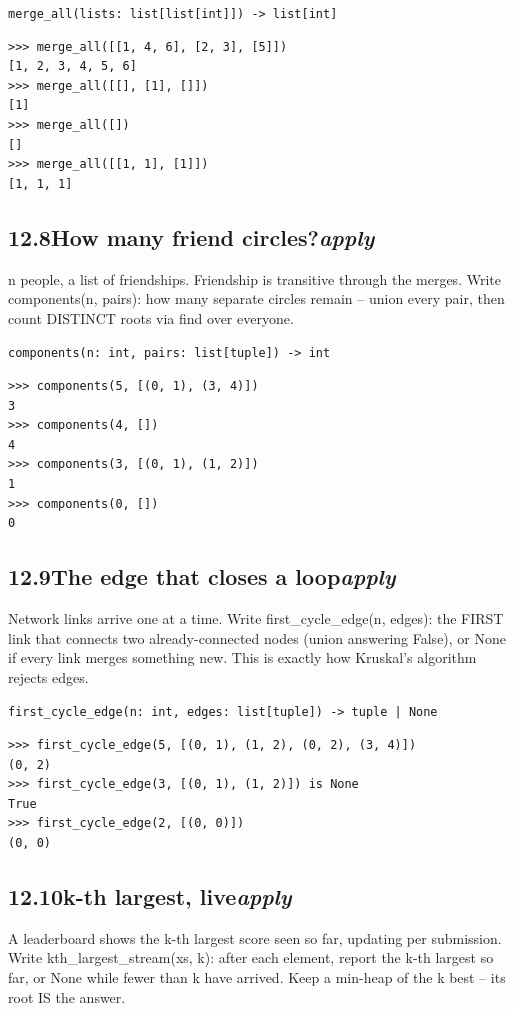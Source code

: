 \documentclass[10pt,letterpaper]{book}
\begin{document}
\noindent\texttt{merge\_all(lists: list[list[int]]) -> list[int]}
\begin{lstlisting}[style=ex]
>>> merge_all([[1, 4, 6], [2, 3], [5]])
[1, 2, 3, 4, 5, 6]
>>> merge_all([[], [1], []])
[1]
>>> merge_all([])
[]
>>> merge_all([[1, 1], [1]])
[1, 1, 1]
\end{lstlisting}
\subsection*{12.8\quad How many friend circles?\hfill\textnormal{\textit{apply}}}
n people, a list of friendships. Friendship is transitive through the merges. Write components(n, pairs): how many separate circles remain -- union every pair, then count DISTINCT roots via find over everyone.

\noindent\texttt{components(n: int, pairs: list[tuple]) -> int}
\begin{lstlisting}[style=ex]
>>> components(5, [(0, 1), (3, 4)])
3
>>> components(4, [])
4
>>> components(3, [(0, 1), (1, 2)])
1
>>> components(0, [])
0
\end{lstlisting}
\subsection*{12.9\quad The edge that closes a loop\hfill\textnormal{\textit{apply}}}
Network links arrive one at a time. Write first\_cycle\_edge(n, edges): the FIRST link that connects two already-connected nodes (union answering False), or None if every link merges something new. This is exactly how Kruskal's algorithm rejects edges.

\noindent\texttt{first\_cycle\_edge(n: int, edges: list[tuple]) -> tuple | None}
\begin{lstlisting}[style=ex]
>>> first_cycle_edge(5, [(0, 1), (1, 2), (0, 2), (3, 4)])
(0, 2)
>>> first_cycle_edge(3, [(0, 1), (1, 2)]) is None
True
>>> first_cycle_edge(2, [(0, 0)])
(0, 0)
\end{lstlisting}
\subsection*{12.10\quad k-th largest, live\hfill\textnormal{\textit{apply}}}
A leaderboard shows the k-th largest score seen so far, updating per submission. Write kth\_largest\_stream(xs, k): after each element, report the k-th largest so far, or None while fewer than k have arrived. Keep a min-heap of the k best -- its root IS the answer.
\end{document}
